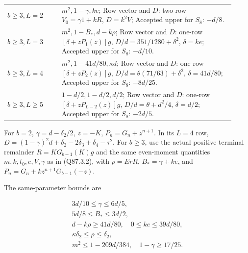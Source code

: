 \begin{longtable}{@{}p{0.2200\linewidth}p{0.7000\linewidth}@{}}
\addlinespace[2pt]
\(b\ge\allowbreak 3,\allowbreak  L=\allowbreak 2\) & \(m^2,\allowbreak  1-\gamma,\allowbreak  ke\); Row vector and \(D\): two-row \(V_0=\allowbreak \gamma1+kR\), \(D=\allowbreak k^2V\); Accepted upper for \(S_8\): \(-d/8\). \\
\addlinespace[2pt]
\(b\ge\allowbreak 3,\allowbreak  L=\allowbreak 3\) & \(m^2,\allowbreak  1-B_*,\allowbreak  d-k\rho\); Row vector and \(D\): one-row \([\delta+zP_1(z)]g\), \(D/d=\allowbreak 351/1280+\delta^2\), \(\delta=\allowbreak ke\); Accepted upper for \(S_8\): \(-d/10\). \\
\addlinespace[2pt]
\(b\ge\allowbreak 3,\allowbreak  L=\allowbreak 4\) & \(m^2,\allowbreak  1-41d/80,\allowbreak  \kappa d\); Row vector and \(D\): one-row \([\delta+zP_2(z)]g\), \(D/d=\allowbreak \theta(71/63)+\delta^2\), \(\delta=\allowbreak 41d/80\); Accepted upper for \(S_8\): \(-8d/25\). \\
\addlinespace[2pt]
\(b\ge\allowbreak 3,\allowbreak  L\ge\allowbreak 5\) & \(1-d/2,\allowbreak  1-d/2,\allowbreak  d/2\); Row vector and \(D\): one-row \([\delta+zP_{L-2}(z)]g\), \(D/d=\allowbreak \theta+d^2/4\), \(\delta=\allowbreak d/2\); Accepted upper for \(S_8\): \(-2d/5\). \\
\end{longtable}
\endgroup


For \(b=\allowbreak 2\), \(\gamma=\allowbreak d-\delta_2/2\), \(z=\allowbreak -K\),
\(P_n=\allowbreak G_n+z^{n+1}\). In its \(L=\allowbreak 4\) row,
\(D=\allowbreak (1-\gamma)^2d+\delta_2-2\delta_3+\delta_4-\tau^2\).
For \(b\ge\allowbreak 3\), use the actual positive terminal remainder
\(R=\allowbreak KG_{b-1}(K)g\) and the same even-moment quantities
\(m,\allowbreak  k,\allowbreak  t_0,\allowbreak  e,\allowbreak  V,\allowbreak  \gamma\) as in (Q87.3.2), with
\(\rho=\allowbreak ErR\), \(B_*=\allowbreak \gamma+ke\), and
\(P_n=\allowbreak G_n+kz^{n+1}G_{b-1}(-z)\).

The same-parameter bounds are

\[
\begin{gathered}
3d/10\le\gamma\le6d/5,\quad\\
5d/8\le B_*\le3d/2,\quad\\
d-k\rho\ge41d/80,\quad 0\le ke\le39d/80,
\end{gathered}
\]
\[
\begin{gathered}
\kappa \delta_2\le\rho\le \delta_2,\quad\\
m^2\le1-209d/384,\quad 1-\gamma\ge17/25.
\end{gathered}\tag{Q87.4.3}\label{eq:Q87:4.3}
\]

